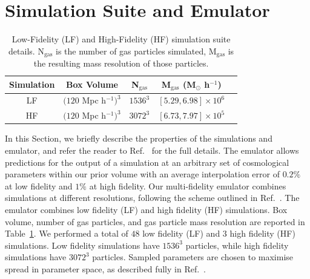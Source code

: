 \section{Simulation Suite and Emulator}
\label{sec:emulator}
\label{sec:simulations}

\begin{table}
	\centering
     \begin{tabular}{|c|c|c|c|c|}
		\hline
		Simulation & Box Volume & N$_{\text{gas}}$ & M$_{\text{gas}}$ (M$_{\odot}$ h$^{-1}$)\\
		\hline
		LF & $(120$ Mpc h$^{-1})^3$ & $1536^3$ & $[5.29, 6.98]\times10^6$\\
		HF & $(120$ Mpc h$^{-1})^3$ & $3072^3$ & $[6.73, 7.97]\times10^5$\\
		\hline
	\end{tabular}
    \caption{\label{table:simulations}
    Low-Fidelity (LF) and High-Fidelity (HF) simulation suite details.
    N$_{\text{gas}}$ is the number of gas particles simulated, M$_{\text{gas}}$ is the resulting mass resolution of those particles.}
\end{table}

In this Section, we briefly describe the properties of the simulations and emulator, and refer the reader to Ref.~\cite{2023simsuite} for the full details.
The emulator allows predictions for the output of a simulation at an arbitrary set of cosmological parameters within our prior volume with an average interpolation error of $0.2\%$ at low fidelity and $1\%$ at high fidelity.
Our multi-fidelity emulator combines simulations at different resolutions, following the scheme outlined in Ref.~\cite{2022MNRAS.517.3200F}. The emulator combines low fidelity (LF) and high fidelity (HF) simulations. Box volume, %
number of gas particles, and gas particle mass resolution are reported in Table~\ref{table:simulations}. We performed a total of $48$ low fidelity (LF) and $3$ high fidelity (HF) simulations. Low fidelity simulations have  $1536^3$ particles, while high fidelity simulations have $3072^3$ particles. Sampled parameters are chosen to maximise spread in parameter space, as described fully in Ref.~\cite{2023simsuite}.

